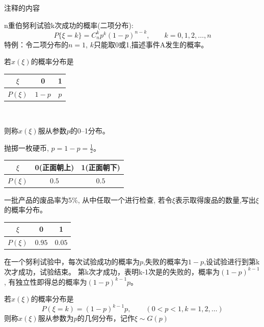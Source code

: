 
注释的内容

\begin{frame}
n重伯努利试验k次成功的概率(二项分布):
\[P\{\xi=k\}=C_{n}^{k}p^{k}(1-p)^{n-k},\qquad k=0,1,2,\dots,n\]
特例：令二项分布的$n=1$, $k$只能取0或1,描述事件A发生的概率。

\begin{definition}[0--1分布]
	若$x(\xi)$的概率分布是\\
	\begin{center}
	\begin{tabular}{|c|c|c|}
		\hline 
		$\xi$ & 0 & 1\\ 
		\hline 
		$P(\xi)$ & $1-p$ & $p$\\ 
		\hline 
	\end{tabular} \\
	\end{center}
	则称$x(\xi)$服从参数$p$的0--1分布。
\end{definition}

\end{frame}

\begin{frame}
\begin{example}
	抛掷一枚硬币, $p=1-p=\frac{1}{2}$。\\
	\begin{tabular}{|c|c|c|}
		\hline 
		$\xi$ & 0(正面朝上) & 1(正面朝下)\\ 
		\hline 
		$P(\xi)$ & $0.5$ & $0.5$\\ 
		\hline 
	\end{tabular} 
\end{example}

\begin{example}
	一批产品的废品率为5\%, 从中任取一个进行检查, 若令$\xi$表示取得废品的数量,写出$\xi$的概率分布。\\
	\begin{tabular}{|c|c|c|}
		\hline 
		$\xi$ & 0 & 1\\ 
		\hline 
		$P(\xi)$ & $0.95$ & $0.05$\\ 
		\hline 
	\end{tabular} 
\end{example}
\end{frame}

\begin{frame}
在一个努利试验中，每次试验成功的概率为$p$,失败的概率为$1-p$,设试验进行到第k次才成功，试验结束。
第k次才成功，表明k-1次是的失败的，概率为$(1-p)^{k-1}$, 有独立性即得总的概率为$(1-p)^{k-1}p$。

\begin{definition}[几何分布]
	若$x(\xi)$的概率分布是
	\[P(\xi=k)=(1-p)^{k-1}p,\qquad (0<p<1,k=1,2,\dots)\]
	则称$x(\xi)$服从参数为$p$的几何分布，记作$\xi\sim G(p)$
\end{definition}
\end{frame}

